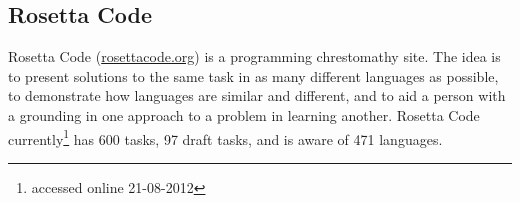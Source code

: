% 
%
%

\begin{partbacktext}
\part{Rosetta Code}
\noindent Rosetta Code
(\href{http://rosettacode.org/wiki/Rosetta_Code}{rosettacode.org})
is a programming chrestomathy site. The idea is to present solutions
to the same task in as many different languages as possible, to
demonstrate how languages are similar and different, and to aid a
person with a grounding in one approach to a problem in learning
another. Rosetta Code currently\footnote{accessed online 21-08-2012}
has 600 tasks, 97 draft tasks, and is aware of 471 languages.
\end{partbacktext}